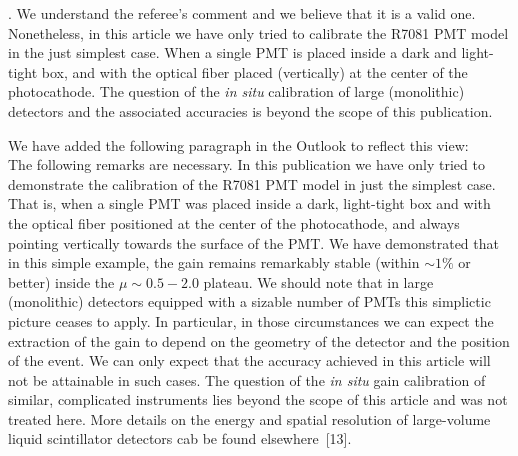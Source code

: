 \documentclass[a4paper,11pt]{article}
\begin{document}
. We understand the referee's comment and we believe that it is a valid one.  
Nonetheless, in this article we have only tried to calibrate the R7081 PMT model in the just simplest case. 
When a single PMT is placed inside a dark and light-tight box, and with the optical fiber placed (vertically) at the center of the photocathode. 
The question of the \emph{in situ} calibration of large (monolithic) detectors and the associated accuracies is beyond the scope of this publication. 

We have added the following paragraph in the Outlook to reflect this view:
\\[1ex]

The following remarks are necessary. 
In this publication we have only tried to demonstrate the calibration of the R7081 PMT model in just the simplest case. 
That is, when a single PMT was placed inside a dark, light-tight box and with the optical fiber positioned at the center of the photocathode, and always pointing vertically towards the surface of the PMT. 
We have demonstrated that in this simple example, the gain remains remarkably stable (within $\sim 1\%$ or better) inside the $\mu \sim 0.5 - 2.0$ plateau. 
We should note that in large (monolithic) detectors equipped with a sizable number of PMTs this simplictic picture ceases to apply. 
In particular, in those circumstances we can expect the extraction of the gain to depend on the geometry of the detector and the position of the event. 
 We can only expect that the accuracy achieved in this article will not be attainable in such cases.
The question of the \emph{in situ} gain calibration of similar, complicated instruments lies beyond the scope of this article and was not treated here. 
More details on the energy and spatial resolution of large-volume liquid scintillator detectors cab be found elsewhere~[13]. 
\end{document}
